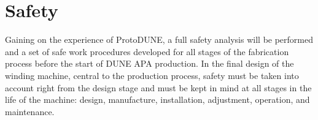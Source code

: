 \section{Safety} %
\label{sec:fdsp-apa-safety}

Gaining on the experience of ProtoDUNE, a full safety analysis will be performed and a set of safe work procedures developed for all stages of the fabrication process before the start of DUNE APA production.  In the final design of the winding machine, central to the production process, safety must be taken into account right from the design stage and must be kept in mind at all stages in the life of the machine: design, manufacture, installation, adjustment, operation, and maintenance.     

